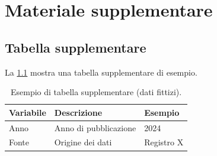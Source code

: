 \chapter{Materiale supplementare}
\label{app:esempio}

\section{Tabella supplementare}

La \cref{tab:supp_esempio} mostra una tabella supplementare di esempio.

\begin{table}[htbp]
  \centering
  \caption{Esempio di tabella supplementare (dati fittizi).}
  \label{tab:supp_esempio}
  \begin{tabular}{lll}
    \toprule
    Variabile & Descrizione & Esempio \\
    \midrule
    Anno & Anno di pubblicazione & 2024 \\
    Fonte & Origine dei dati & Registro X \\
    \bottomrule
  \end{tabular}
\end{table}
